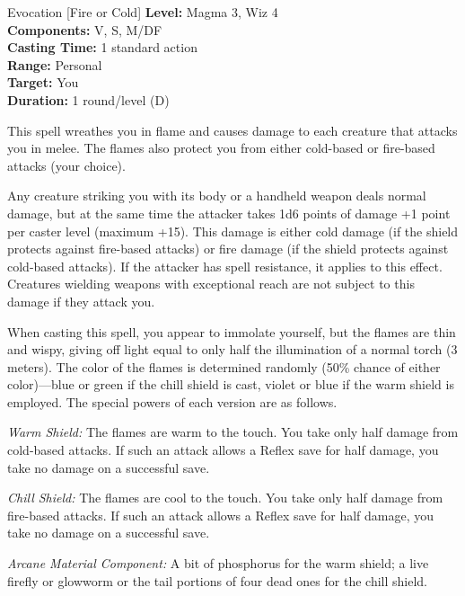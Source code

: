 {Evocation [Fire or Cold]}
{
	\textbf{Level:}
	Magma 3, Wiz 4\\
	\textbf{Components:}
	V, S, M/DF\\
	\textbf{Casting Time:}
	1 standard action\\
	\textbf{Range:}
	Personal\\
	\textbf{Target:}
	You\\
	\textbf{Duration:}
	1 round/level (D)\\
}
{
	This spell wreathes you in flame and causes damage to each creature that attacks you in melee. The flames also protect you from either cold-based or fire-based attacks (your choice).

	Any creature striking you with its body or a handheld weapon deals normal damage, but at the same time the attacker takes 1d6 points of damage +1 point per caster level (maximum +15). This damage is either cold damage (if the shield protects against fire-based attacks) or fire damage (if the shield protects against cold-based attacks). If the attacker has spell resistance, it applies to this effect. Creatures wielding weapons with exceptional reach are not subject to this damage if they attack you.

	When casting this spell, you appear to immolate yourself, but the flames are thin and wispy, giving off light equal to only half the illumination of a normal torch (3 meters). The color of the flames is determined randomly (50\% chance of either color)---blue or green if the chill shield is cast, violet or blue if the warm shield is employed. The special powers of each version are as follows.

	\textit{Warm Shield:}
	The flames are warm to the touch. You take only half damage from cold-based attacks. If such an attack allows a Reflex save for half damage, you take no damage on a successful save.

	\textit{Chill Shield:}
	The flames are cool to the touch. You take only half damage from fire-based attacks. If such an attack allows a Reflex save for half damage, you take no damage on a successful save.

	\textit{Arcane Material Component:}
	A bit of phosphorus for the warm shield; a live firefly or glowworm or the tail portions of four dead ones for the chill shield.

}
